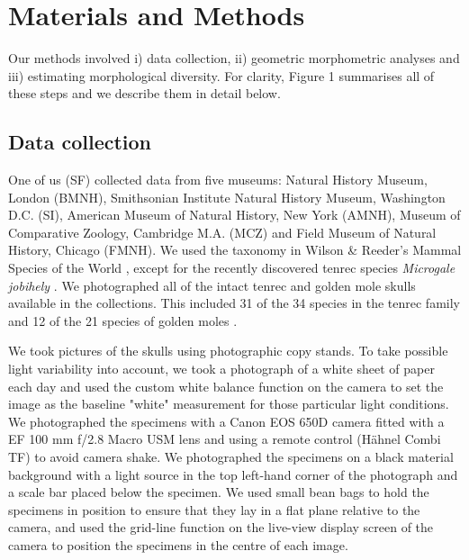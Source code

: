 \documentclass[12pt,a4paper]{article}
\begin{document}
\section{Materials and Methods}

	Our methods involved i) data collection, ii) geometric morphometric analyses and iii) estimating morphological diversity. For clarity,  Figure 1 summarises all of these steps and we describe them in detail below.  	
	
\subsection{Data collection}
	One of us (SF) collected data from five museums: Natural History Museum, London (BMNH), Smithsonian Institute Natural History Museum, Washington D.C. (SI), American Museum of Natural History, New York (AMNH), Museum of Comparative Zoology, Cambridge M.A. (MCZ) and Field Museum of Natural History, Chicago (FMNH). We used the taxonomy in Wilson \& Reeder's Mammal Species of the World \citeyearpar{Wilson2005}, except for the recently discovered tenrec species \textit{Microgale jobihely} \citep{Goodman2006}. We photographed all of the intact tenrec and golden mole skulls available in the collections. This included 31 of the 34 species in the tenrec family \citep{Olson2013} and 12 of the 21 species of golden moles \citep{Wilson2005}.
	
	We took pictures of the skulls using photographic copy stands. To take possible light variability into account, we took a photograph of a white sheet of paper each day and used the custom white balance function on the camera to set the image as the baseline "white" measurement for those particular light conditions. We photographed the specimens with a Canon EOS 650D camera fitted with a EF 100 mm f/2.8 Macro USM lens and using a remote control (H\"ahnel Combi TF) to avoid camera shake. We photographed the specimens on a black material background with a light source in the top left-hand corner of the photograph and a scale bar placed below the specimen. We used small bean bags to hold the specimens in position to ensure that they lay in a flat plane relative to the camera, and used the grid-line function on the live-view display screen of the camera to position the specimens in the centre of each image. 
	
\end{document}
